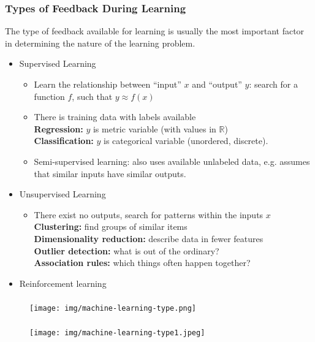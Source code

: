 \documentclass[UTF8,11pt,colorlinks,compress,openany]{beamer}%
\begin{document}
\begin{frame}\frametitle{Types of Feedback During Learning}
The type of feedback available for learning is usually the most important factor in determining the nature of the learning problem.
\begin{itemize}
	\item Supervised Learning
		\begin{itemize}
			\item Learn the relationship between ``input'' $x$ and ``output'' $y$: search for a function $f$, such that $y\approx f(x)$
			\item There is training data with labels available\\
			\textbf{Regression:} $y$ is metric variable (with values in $\mathbb{R}$)\\
			\textbf{Classification:} $y$ is categorical variable (unordered, discrete).
			\item Semi-supervised learning: also uses available unlabeled data, e.g. assumes that similar inputs have similar outputs.
		\end{itemize}
	\item Unsupervised Learning
		\begin{itemize}
			\item There exist no outputs, search for patterns within the inputs $x$\\
			\textbf{Clustering:} find groups of similar items\\
			\textbf{Dimensionality reduction:} describe data in fewer features\\
			\textbf{Outlier detection:} what is out of the ordinary?\\
			\textbf{Association rules:} which things often happen together?
		\end{itemize}
	\item Reinforcement learning
\end{itemize}
\end{frame}

\begin{frame}\frametitle{}
\begin{figure}[H]
\texttt{[image: img/machine-learning-type.png]}	
\end{figure}
\end{frame}

\begin{frame}\frametitle{}
\begin{figure}[H]
\texttt{[image: img/machine-learning-type1.jpeg]}	
\end{figure}
\end{frame}
\end{document}

